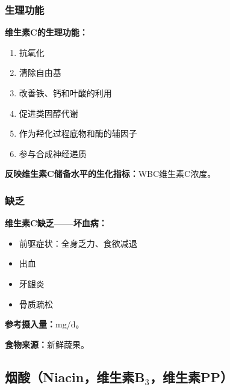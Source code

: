 \subsubsection{生理功能}

\begin{keybox}
\textbf{维生素C的生理功能：}
\begin{enumerate}[leftmargin=*]
    \item 抗氧化
    \item 清除自由基
    \item 改善铁、钙和叶酸的利用
    \item 促进类固醇代谢
    \item 作为羟化过程底物和酶的辅因子
    \item 参与合成神经递质
\end{enumerate}

\textbf{反映维生素C储备水平的生化指标：}WBC维生素C浓度。
\end{keybox}

\subsubsection{缺乏}

\begin{keybox}
\textbf{维生素C缺乏——坏血病：}
\begin{itemize}[leftmargin=*]
    \item 前驱症状：全身乏力、食欲减退
    \item 出血
    \item 牙龈炎
    \item 骨质疏松
\end{itemize}

\textbf{参考摄入量：}mg/d。

\textbf{食物来源：}新鲜蔬果。
\end{keybox}

\subsection{烟酸（Niacin，维生素B$_3$，维生素PP）}

